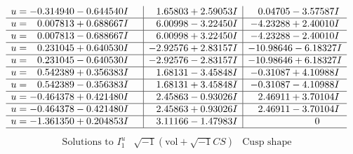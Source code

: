 \documentclass[1p]{elsarticle_modified}
\theoremstyle{definition}
\newcommand{\I}{\sqrt{-1}}
\begin{document}
$$\begin{array}{c|c|c}
\begin{aligned}
u &= -0.314940 - 0.644540 I\end{aligned}
 & \phantom{-}1.65803 + 2.59053 I & \phantom{-}0.04705 - 3.57587 I \\ \hline\begin{aligned}
u &= \phantom{-}0.007813 + 0.688667 I\end{aligned}
 & \phantom{-}6.00998 - 3.22450 I & -4.23288 + 2.40010 I \\ \hline\begin{aligned}
u &= \phantom{-}0.007813 - 0.688667 I\end{aligned}
 & \phantom{-}6.00998 + 3.22450 I & -4.23288 - 2.40010 I \\ \hline\begin{aligned}
u &= \phantom{-}0.231045 + 0.640530 I\end{aligned}
 & -2.92576 + 2.83157 I & -10.98646 - 6.18327 I \\ \hline\begin{aligned}
u &= \phantom{-}0.231045 - 0.640530 I\end{aligned}
 & -2.92576 - 2.83157 I & -10.98646 + 6.18327 I \\ \hline\begin{aligned}
u &= \phantom{-}0.542389 + 0.356383 I\end{aligned}
 & \phantom{-}1.68131 - 3.45848 I & -0.31087 + 4.10988 I \\ \hline\begin{aligned}
u &= \phantom{-}0.542389 - 0.356383 I\end{aligned}
 & \phantom{-}1.68131 + 3.45848 I & -0.31087 - 4.10988 I \\ \hline\begin{aligned}
u &= -0.464378 + 0.421480 I\end{aligned}
 & \phantom{-}2.45863 - 0.93026 I & \phantom{-}2.46911 + 3.70104 I \\ \hline\begin{aligned}
u &= -0.464378 - 0.421480 I\end{aligned}
 & \phantom{-}2.45863 + 0.93026 I & \phantom{-}2.46911 - 3.70104 I \\ \hline\begin{aligned}
u &= -1.361350 + 0.204853 I\end{aligned}
 & \phantom{-}3.11166 - 1.47983 I & \phantom{-0.000000 } 0\\
 \hline 
 \end{array}$$\newpage$$\begin{array}{c|c|c}  
\text{Solutions to }I^u_{1}& \I (\text{vol} + \sqrt{-1}CS) & \text{Cusp shape}\\

\end{array}$$
\end{document}

